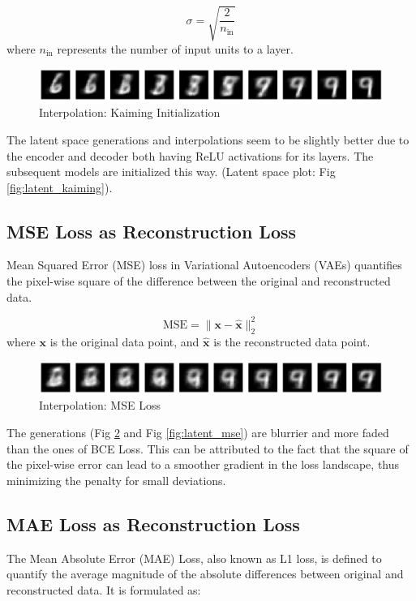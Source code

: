 \documentclass[12pt]{article}
\begin{document}
\begin{equation}
\sigma = \sqrt{\frac{2}{n_{\text{in}}}}
\end{equation}
where $n_{\text{in}}$ represents the number of input units to a layer.

\begin{figure}[h]
\centering
\includegraphics[width=1\linewidth]{report_images/kaiming_init/interpolation.png}
\caption{\label{fig:inter_kaiming}Interpolation: Kaiming Initialization}
\end{figure}

The latent space generations and interpolations seem to be slightly better due to the encoder and decoder both having ReLU activations for its layers. The subsequent models are initialized this way. (Latent space plot: Fig \ref{fig:latent_kaiming}).

\subsection{MSE Loss as Reconstruction Loss}
Mean Squared Error (MSE) loss in Variational Autoencoders (VAEs) quantifies the pixel-wise square of the difference between the original and reconstructed data.

\begin{equation}
\text{MSE} = \|\mathbf{x} - \hat{\mathbf{x}}\|^2_2
\end{equation}
\noindent
where $\mathbf{x}$ is the original data point, and $\hat{\mathbf{x}}$ is the reconstructed data point.

\begin{figure}[h]
\centering
\includegraphics[width=1\linewidth]{report_images/mse/interpolation.png}
\caption{\label{fig:inter_mse}Interpolation: MSE Loss}
\end{figure}
\noindent
The generations (Fig \ref{fig:inter_mse} and Fig \ref{fig:latent_mse}) are blurrier and more faded than the ones of BCE Loss. This can be attributed to the fact that the square of the pixel-wise error can lead to a smoother gradient in the loss landscape, thus minimizing the penalty for small deviations.

\subsection{MAE Loss as Reconstruction Loss}
The Mean Absolute Error (MAE) Loss, also known as L1 loss, is defined to quantify the average magnitude of the absolute differences between original and reconstructed data. It is formulated as:
\end{document}

